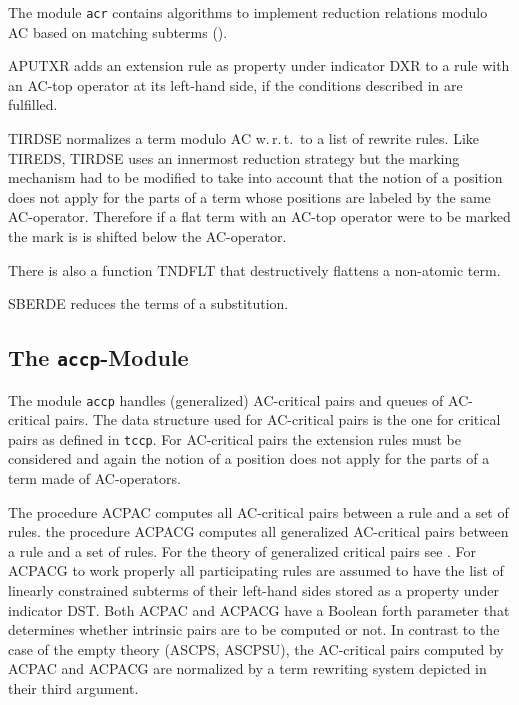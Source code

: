 The module {\tt acr} contains algorithms to implement reduction relations
modulo AC based on matching subterms (\cite{PetersonStickel:81}).

APUTXR adds an extension rule as property under indicator DXR to a rule with
an AC-top operator at its left-hand side,
if the conditions described in \cite[pp 255]{PetersonStickel:81} are
fulfilled.

TIRDSE normalizes a term modulo AC w.\,r.\,t.\ to a list of rewrite rules.
Like TIREDS, TIRDSE uses an innermost reduction strategy but the marking
mechanism had to be modified to take into account that the notion of a position
does not apply for the parts of a term whose positions are labeled by the
same AC-operator. 
Therefore if a  flat term with an AC-top operator were to be marked the 
mark is is shifted below the AC-operator.

There is also a function TNDFLT that destructively flattens a non-atomic
term.

SBERDE reduces the terms of a substitution.

\subsection{The {\tt accp}-Module}

The module {\tt accp} handles (generalized) AC-critical pairs and 
queues of AC-critical pairs.
The data structure used for AC-critical pairs is the one for
critical pairs as defined in {\tt tccp}.
For AC-critical pairs the extension rules must be considered and again
the notion of a position does not apply for the parts of a term made 
of AC-operators.

The procedure ACPAC computes all AC-critical pairs between a rule and
a  set of rules.
the procedure ACPACG computes all generalized  AC-critical pairs
between a rule and a  set of rules.
For the theory of generalized critical pairs see \cite{Buendgen:94}.
For ACPACG to work properly all participating rules are assumed to
have the list of linearly constrained subterms of their left-hand sides
stored as a property under indicator DST.
Both ACPAC and ACPACG have a Boolean forth parameter that determines
whether intrinsic pairs are to be computed or not.
In contrast to the case of the empty theory (ASCPS, ASCPSU), the AC-critical
pairs computed by ACPAC and ACPACG are normalized by a
term rewriting system depicted in their third argument.

